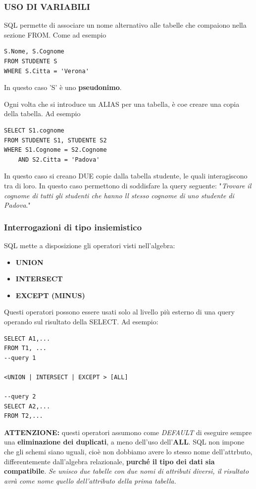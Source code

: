 \documentclass{article}
\newcounter{esempio}
\begin{document}
\subsubsection{USO DI VARIABILI}
SQL permette di associare un nome alternativo alle tabelle che compaiono nella sezione FROM. Come ad esempio
\begin{lstlisting}[style=sqlstyle]
S.Nome, S.Cognome
FROM STUDENTE S
WHERE S.Citta = 'Verona'
\end{lstlisting}
In questo caso 'S' è uno \textbf{pseudonimo}.

Ogni volta che si introduce un ALIAS per una tabella, è coe creare una copia della tabella. Ad esempio
\begin{lstlisting}[style=sqlstyle]
SELECT S1.cognome
FROM STUDENTE S1, STUDENTE S2
WHERE S1.Cognome = S2.Cognome 
	AND S2.Citta = 'Padova'
\end{lstlisting}	
In questo caso si creano DUE copie dalla tabella studente, le quali interagiscono tra di loro. In questo caso permettono di soddisfare la query seguente: "\textit{Trovare il cognome di tutti gli studenti che hanno ll stesso cognome di uno studente di Padova}."

\subsubsection{Interrogazioni di tipo insiemistico}
SQL mette a disposizione gli operatori visti nell'algebra: \begin{itemize}
	\item \textbf{UNION}
	\item \textbf{INTERSECT}
	\item \textbf{EXCEPT (MINUS)}
\end{itemize}
Questi operatori possono essere usati solo al livello più esterno di una query operando sul risultato della SELECT. Ad esempio: 
\begin{lstlisting}[style=sqlstyle]
SELECT A1,...
FROM T1, ...
--query 1

<UNION | INTERSECT | EXCEPT > [ALL]

--query 2
SELECT A2,...
FROM T2,...
\end{lstlisting}
\textbf{ATTENZIONE:} questi operatori assumono come \textit{DEFAULT} di eseguire sempre una \textbf{eliminazione dei duplicati}, a meno dell'uso dell'\textbf{ALL}. 
SQL non impone che gli schemi siano uguali, cioè non dobbiamo avere lo stesso nome dell'attrbuto, differentemente dall'algebra relazionale, \textbf{purché il tipo dei dati sia compatibile}. \textit{Se unisco due tabelle con due nomi di attributi diversi, il risultato avrà come nome quello dell'attributo della prima tabella.} 
\end{document}
